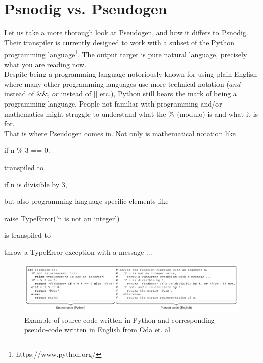 \section{Psnodig vs. Pseudogen}

Let us take a more thorough look at Pseudogen, and how it differs to Psnodig. Their transpiler is currently designed to work with a subset of the Python programming language\footnote{https://www.python.org/}. The output target is pure natural language, precisely what you are reading now. \hfill \\

Despite being a programming language notoriously known for using plain English where many other programming languages use more technical notation ($and$ instead of $\&\&$, $or$ instead of $||$ etc.), Python still bears the mark of being a programming language. People not familiar with programming and/or mathematics might struggle to understand what the \% (modulo) is and what it is for. \hfill \\

That is where Pseudogen comes in. Not only is mathematical notation like

\begin{displayquote}
    if n \% 3 == 0:
\end{displayquote}

transpiled to

\begin{displayquote}
    if n is divisible by 3,
\end{displayquote}

but also programming language specific elements like

\begin{displayquote}
    raise TypeError('n is not an integer')
\end{displayquote}

is transpiled to

\begin{displayquote}
    throw a TypeError exception with a message ...
\end{displayquote}

\begin{figure}[ht]
    \centering
    \includegraphics[scale=0.52]{assets/odaetal.png}
    \caption{Example of source code written in Python and corresponding pseudo-code written in English from Oda et. al}
    \label{fig:enter-label}
\end{figure}

